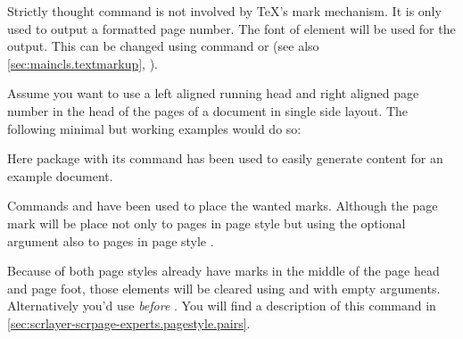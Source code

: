   Strictly thought command  is not involved by \TeX's mark
  mechanism. It is only used to output a formatted page number.
  The font of element
   will be used
  for the output. This can be changed using command  or
   (see also
  \autoref{sec:maincls.textmarkup}, ).%
    \begin{Example}
      \label{xmpl:\ThisCommonLabelBase.cmd.headmark}%
      Assume you want to use a left aligned running head and right aligned
      page number in the head of the pages of a document in single side
      layout. The following minimal but working examples would do so:
      Here package  with its
      command  has been used to
      easily generate content for an example document.

      Commands  and
       have been used to
      place the wanted marks. Although the page mark will be place not only to
      pages in page style  but using the optional
      argument also to pages in page style .

      Because of both page styles already have marks in the middle of the page
      head and page foot, those elements will be cleared using
       and
       with empty
      arguments. Alternatively you'd use
       \emph{before}
      . You will find a description of
      this command in \autoref{sec:scrlayer-scrpage-experts.pagestyle.pairs}.
    \end{Example}

